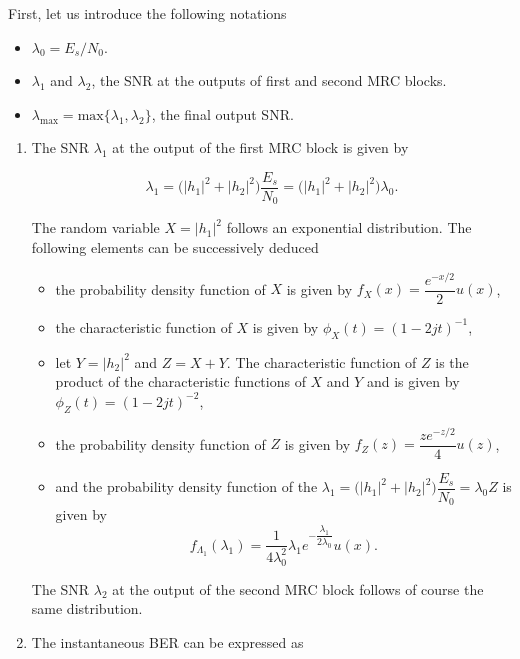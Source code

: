 \documentclass [a4paper, 11pt] {article}
\begin{document}
    \begin{solution}
       First, let us introduce the following notations 

\begin{itemize}
    \item $\lambda_0 = E_s/N_0$.
    \item $\lambda_1$ and $\lambda_2$, the SNR at the outputs of first and second MRC blocks.
    \item $\lambda_{\text{max}} = \text{max}\{\lambda_1,\lambda_2\}$, the final output SNR.
\end{itemize}

\begin{enumerate}

\item The SNR $\lambda_1$ at the output of the first MRC block is given by 

\begin{equation}\lambda_1 = \big(|h_1|^2+|h_2|^2 \big) \frac{E_s}{N_0} = \big(|h_1|^2+|h_2|^2 \big) \lambda_0.
\end{equation}

The random variable $X = |h_1|^2$ follows an exponential distribution. The following elements can be successively deduced 
\begin{itemize}
    \item the probability density function of $X$ is given by $ f_X(x) = \dfrac{e^{-x/2}}{2} u(x)$,
    \item the characteristic function of $X$ is given by $\phi_X(t) = (1-2 jt)^{-1}$,
    \item let $Y = |h_2|^2$ and $Z = X+Y$. The characteristic function of $Z$ is the product of the characteristic functions of $X$ and $Y$ and is given by $\phi_Z(t) = (1-2 jt)^{-2}$,
    \item the probability density function of $Z$ is given by $f_Z(z) = \dfrac{ze^{-z/2}}{4} u(z)$,
    \item and the probability density function of the $\lambda_1 = \big(|h_1|^2+|h_2|^2 \big) \dfrac{E_s}{N_0} = \lambda_0 Z$ is given by 
    \begin{equation}f_{\Lambda_1}(\lambda_1) = \frac{1}{4\lambda_0^2}\lambda_1 e^{-\dfrac{\lambda_1}{2\lambda_0}} u(x).\end{equation}
\end{itemize}

The SNR $\lambda_2$ at the output of the second MRC block follows of course the same distribution. 

\item The instantaneous BER can be expressed as 


\end{enumerate}
\end{solution}
\end{document}
